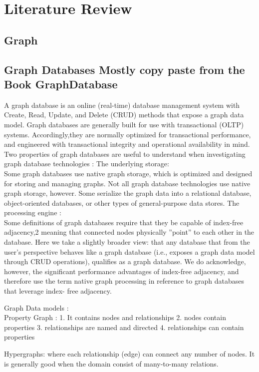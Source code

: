 \documentclass[english]{tktltiki}
\begin{document}
\section{Literature Review}



\subsection{Graph}
\subsection{Graph Databases Mostly copy paste from the Book GraphDatabase}
A graph database is an online (real-time) database management system with Create, Read, Update, and Delete (CRUD) methods that expose a graph data model. Graph databases are generally built for use with transactional (OLTP) systems. Accordingly,they are normally optimized for transactional performance, and engineered with transactional integrity and operational availability in mind.
Two properties of graph databases are useful to understand when investigating graph database technologies :
The underlying storage: \\
Some graph databases use native graph storage, which is optimized and designed for storing and managing graphs. Not all graph database technologies use native graph storage, however. Some serialize the graph data into a relational database, object-oriented databases, or other types of general-purpose data stores.
The processing engine :\\
Some definitions of graph databases require that they be capable of index-free adjacency,2 meaning that connected nodes physically ''point'' to each other in the database. Here we take a slightly broader view: that any database that from the user's perspective behaves like a graph database (i.e., exposes a graph data model through CRUD operations), qualifies as a graph database. We do acknowledge, however, the significant performance advantages of index-free adjacency, and therefore use the term native graph processing in reference to graph databases that leverage index- free adjacency.

Graph Data models : \\
Property Graph : 
1. It contains nodes and relationships
2. nodes contain properties
3. relationships are named and directed
4. relationships can contain properties

Hypergraphs:
where each relationship (edge) can connect any number of nodes. It is generally good when the domain consist of many-to-many relations.
\end{document}
